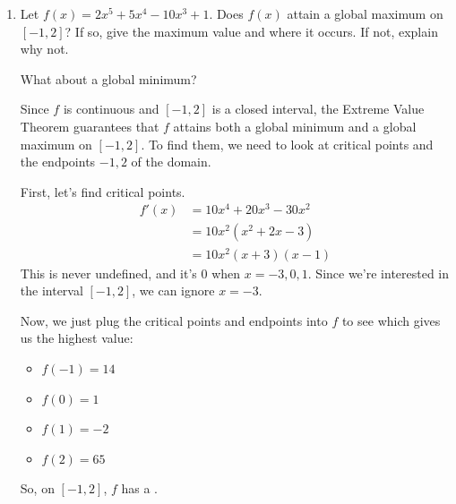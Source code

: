 \documentclass{article}
\theoremstyle{theorem}
\begin{document}
\begin{enumerate}
\begin{enumerate}
    \begin{grading}
      The key features your graph should have are:
      \begin{itemize}
      \item The domain is $[0, 68]$, and the range is $[0, 80]$.
      \item $s^{-1}$ is increasing everywhere.
      \item $s^{-1}$ is concave down until it reaches a height of 30, linear between a height of 30 and 60, and concave up when the height is $> 60$. 
      \end{itemize}
    \end{grading}

  \end{enumerate} 

\item \label{fall2018-prefinal-practice2-7-shortened}  

  \begin{problem}
    Let $f(x)=2x^5+5x^4-10x^3+1$. Does $f(x)$ attain a global maximum on $[-1, 2]$? If so, give the maximum value and where it occurs. If not, explain why not.

    What about a global minimum? 
  \end{problem}

  \begin{solution}
    Since $f$ is continuous and $[-1, 2]$ is a closed interval, the Extreme Value Theorem guarantees that $f$ attains both a global minimum and a global maximum on $[-1, 2]$. To find them, we need to look at critical points and the endpoints $-1, 2$ of the domain.

    First, let's find critical points. 
    \begin{align*}
      f'(x)&=10x^4+20x^3-30x^2 \\
      &=10x^2(x^2+2x-3) \\
      &=10x^2(x+3)(x-1)
    \end{align*}
    This is never undefined, and it's 0 when $x=-3, 0, 1$. Since we're interested in the interval $[-1, 2]$, we can ignore $x = -3$.

    Now, we just plug the critical points and endpoints into $f$ to see which gives us the highest value:
    \begin{itemize}[nosep]
    \item $f(-1)=14$
    \item $f(0)=1$
    \item $f(1)=-2$
    \item $f(2)=65$
    \end{itemize}
    So, on $[-1, 2]$, $f$ has a .
  \end{solution}


\end{enumerate}
\end{document}

